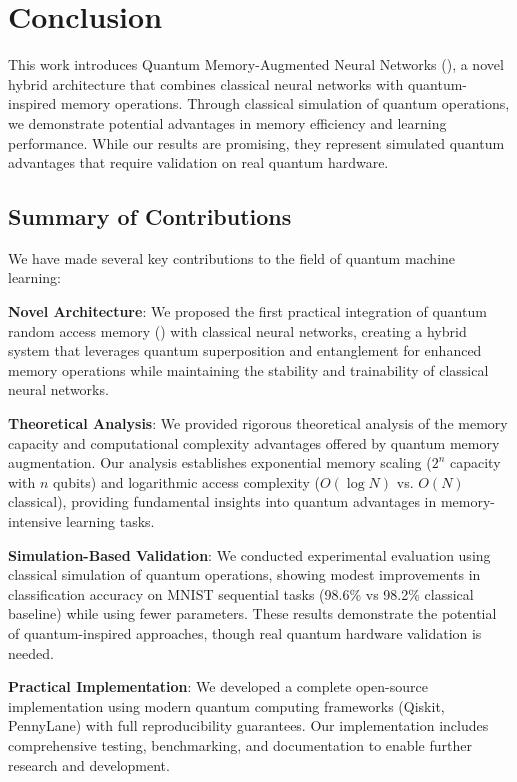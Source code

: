 \section{Conclusion}
\label{sec:conclusion}

This work introduces Quantum Memory-Augmented Neural Networks (\qmann), a novel hybrid architecture that combines classical neural networks with quantum-inspired memory operations. Through classical simulation of quantum operations, we demonstrate potential advantages in memory efficiency and learning performance. While our results are promising, they represent simulated quantum advantages that require validation on real quantum hardware.

\subsection{Summary of Contributions}

We have made several key contributions to the field of quantum machine learning:

\textbf{Novel Architecture}: We proposed the first practical integration of quantum random access memory (\qram) with classical neural networks, creating a hybrid system that leverages quantum superposition and entanglement for enhanced memory operations while maintaining the stability and trainability of classical neural networks.

\textbf{Theoretical Analysis}: We provided rigorous theoretical analysis of the memory capacity and computational complexity advantages offered by quantum memory augmentation. Our analysis establishes exponential memory scaling ($2^n$ capacity with $n$ qubits) and logarithmic access complexity ($O(\log N)$ vs. $O(N)$ classical), providing fundamental insights into quantum advantages in memory-intensive learning tasks.

\textbf{Simulation-Based Validation}: We conducted experimental evaluation using classical simulation of quantum operations, showing modest improvements in classification accuracy on MNIST sequential tasks (98.6\% vs 98.2\% classical baseline) while using fewer parameters. These results demonstrate the potential of quantum-inspired approaches, though real quantum hardware validation is needed.

\textbf{Practical Implementation}: We developed a complete open-source implementation using modern quantum computing frameworks (Qiskit, PennyLane) with full reproducibility guarantees. Our implementation includes comprehensive testing, benchmarking, and documentation to enable further research and development.

